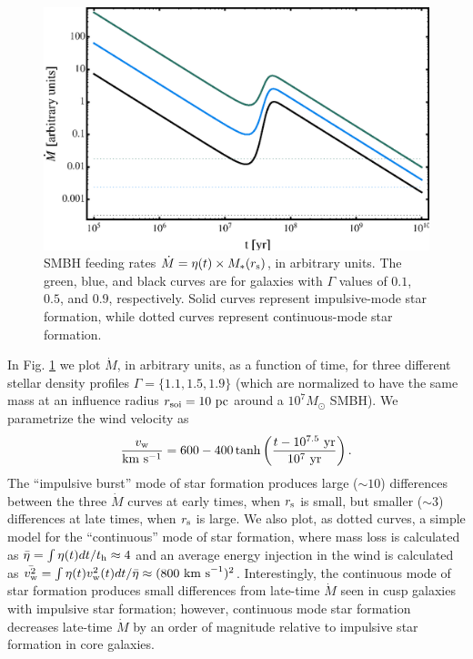 \documentclass[usenatbib,fleqn]{mn2e}
\begin{document}
\begin{figure}
\includegraphics[width=\columnwidth]{NickPlot.eps}
\caption{\label{NickPlot} SMBH feeding rates $\dot{M}=\eta(t) \times M_*(r_{\rm s})$, in arbitrary units.  The green, blue, and black curves are for galaxies with $\Gamma$ values of $0.1$, $0.5$, and $0.9$, respectively.  Solid curves represent impulsive-mode star formation, while dotted curves represent continuous-mode star formation.}
\end{figure}

In Fig. \ref{NickPlot} we plot $\dot{M}$, in arbitrary units, as a
function of time, for three different stellar density profiles $\Gamma
= \{1.1, 1.5, 1.9\}$ (which are normalized to have the same mass at an
influence radius $r
_{\rm soi}=10~{\rm pc}$ around a $10^7M_\odot$ SMBH).  We parametrize the wind velocity as 
\begin{equation}
\frac{v_{\rm w}}{\rm km~s^{-1}}=600-400\tanh\left( \frac{t-10^{7.5}~{\rm yr}}{10^{7}~{\rm yr}}\right).
\end{equation}
The ``impulsive burst'' mode of star formation produces large ($\sim 10$) differences between the three $\dot{M}$ curves at early times, when $r_{\rm s}$ is small, but smaller ($\sim 3$) differences at late times, when $r_{\rm s}$ is large.  We also plot, as dotted curves, a simple model for the ``continuous'' mode of star formation, where mass loss is calculated as $\bar{\eta} = \int\eta(t)dt/t_{\rm h} \approx 4$ and an average energy injection in the wind is calculated as $\bar{v_{\rm w}^2}=\int\eta(t)v_{\rm w}^2(t)dt/\bar{\eta} \approx (800~{\rm km~s}^{-1})^2$.  Interestingly, the continuous mode of star formation produces small differences from late-time $\dot{M}$ seen in cusp galaxies with impulsive star formation; however, continuous mode star formation decreases late-time $\dot{M}$ by an order of magnitude relative to impulsive star formation in core galaxies.
  \footnotesize{
    
    
  }
\end{document}
